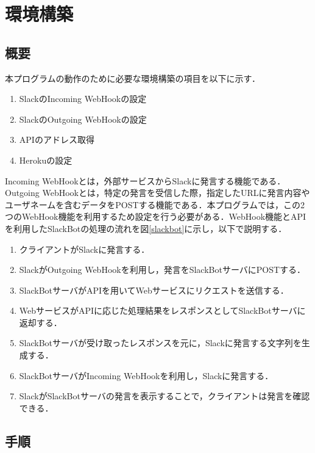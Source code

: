 \documentclass[12pt]{jsarticle}
\begin{document}
\section{環境構築}
\subsection{概要}
本プログラムの動作のために必要な環境構築の項目を以下に示す．
\begin{enumerate}
\item SlackのIncoming WebHookの設定
\item SlackのOutgoing WebHookの設定
\item APIのアドレス取得
\item Herokuの設定
\end{enumerate}
Incoming WebHookとは，外部サービスからSlackに発言する機能である．Outgoing WebHookとは，特定の発言を受信した際，指定したURLに発言内容やユーザネームを含むデータをPOSTする機能である．本プログラムでは，この2つのWebHook機能を利用するため設定を行う必要がある．WebHook機能とAPIを利用したSlackBotの処理の流れを図\ref{slackbot}に示し，以下で説明する．

\begin{enumerate}
\item クライアントがSlackに発言する．
\item SlackがOutgoing WebHookを利用し，発言をSlackBotサーバにPOSTする．
\item SlackBotサーバがAPIを用いてWebサービスにリクエストを送信する．
\item WebサービスがAPIに応じた処理結果をレスポンスとしてSlackBotサーバに返却する．
\item SlackBotサーバが受け取ったレスポンスを元に，Slackに発言する文字列を生成する．
\item SlackBotサーバがIncoming WebHookを利用し，Slackに発言する．
\item SlackがSlackBotサーバの発言を表示することで，クライアントは発言を確認できる．
\end{enumerate}


\subsection{手順}
\end{document}
